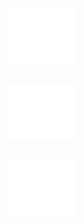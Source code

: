 \documentclass{article}
\begin{document}
\includegraphics[width=18mm]{Blank.jpg}
\par
\textbf{}
\vspace{1cm}

\includegraphics[width=18mm]{Blank.jpg}
\par
\textbf{}
\vspace{1cm}

\includegraphics[width=18mm]{Blank.jpg}
\par
\textbf{}
\vspace{1cm}
\end{document}
